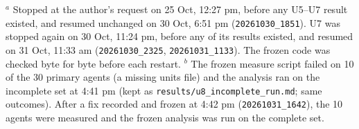 \begin{table}[h]
\smallskip
{\footnotesize $^{a}$ Stopped at the author's request on 25 Oct, 12:27 pm, before any U5--U7 result existed, and resumed unchanged on 30 Oct, 6:51 pm (\texttt{20261030\_1851}). U7 was stopped again on 30 Oct, 11:24 pm, before any of its results existed, and resumed on 31 Oct, 11:33 am (\texttt{20261030\_2325}, \texttt{20261031\_1133}). The frozen code was checked byte for byte before each restart. $^{b}$ The frozen measure script failed on 10 of the 30 primary agents (a missing units file) and the analysis ran on the incomplete set at 4:41 pm (kept as \texttt{results/u8\_incomplete\_run.md}; same outcomes). After a fix recorded and frozen at 4:42 pm (\texttt{20261031\_1642}), the 10 agents were measured and the frozen analysis was run on the complete set.\par}
\end{table}

